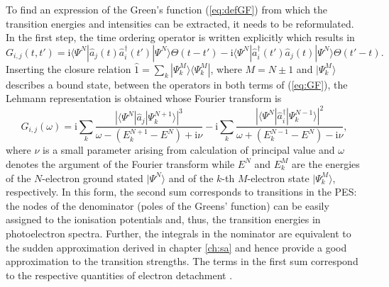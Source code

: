 To find an expression of the Green's function (\ref{eq:defGF}) from which the transition energies and intensities can be extracted, it needs to be reformulated.
In the first step, the time ordering operator is written explicitly which results in 
\begin{equation} \label{eq:GF}
G_{i,j}(t,t')= \text{i}\langle \Psi^N | \hat{a}_j(t)\hat{a}^\dagger_i(t') |\Psi^N\rangle \Theta(t-t') -
                   \text{i} \langle \Psi^N | \hat{a}^\dagger_i(t')\hat{a}_j(t) |\Psi^N\rangle \Theta(t'-t).
\end{equation}
Inserting the closure relation $\hat{1}=\sum_k |\Psi^M_k\rangle\langle \Psi^M_k |$, where $M=N\pm 1$ and $|\Psi^M_k\rangle$ describes a bound state, between the operators in both terms of (\ref{eq:GF}), the Lehmann representation \cite{bookGF} is obtained whose Fourier transform is
\begin{equation}\label{eq:gfSpect}
G_{i,j}(\omega)=\text{i} \sum_k\frac{\left|\langle \Psi^N | \hat{a}_j|\Psi^{N+1}_k \rangle \right|^3}{\omega-(E_k^{N+1}-E^N)+\text{i}\nu}-
                \text{i}\sum_k\frac{\left|\langle \Psi^N | \hat{a}^\dagger_i|\Psi^{N-1}_k \rangle \right|^2}{\omega+(E_k^{N-1}-E^N)-\text{i}\nu},
\end{equation}
where $\nu$ is a small parameter arising from calculation of principal value and $\omega$ denotes the argument of the Fourier transform while $E^N$ and $E_k^M$ are the energies of the $N$-electron ground stated $|\Psi^N\rangle$ and of the $k$-th $M$-electron state $|\Psi_k^M\rangle$, respectively.
In this form, the second sum corresponds to transitions in the PES: the nodes of the denominator (poles of the Greens' function) can be easily assigned to the ionisation potentials and, thus, the transition energies in photoelectron spectra.
Further, the integrals in the nominator are equivalent to the sudden approximation derived in chapter \ref{ch:sa} and hence provide a good approximation to the transition strengths.
The terms in the first sum correspond to the respective quantities of electron detachment \cite{1pGFcederbaum}.

